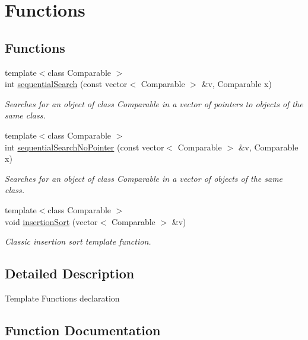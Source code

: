 \hypertarget{group___template}{}\section{Functions}
\label{group___template}
\subsection*{Functions}
\begin{DoxyCompactItemize}
\item 
{\footnotesize template$<$class Comparable $>$ }\\int \hyperlink{group___template_gacd555ad1f1fc3b2011aab63641f98151}{sequential\+Search} (const vector$<$ Comparable $>$ \&v, Comparable x)
\begin{DoxyCompactList}\small\item\em Searches for an object of class Comparable in a vector of pointers to objects of the same class. \end{DoxyCompactList}\item 
{\footnotesize template$<$class Comparable $>$ }\\int \hyperlink{group___template_gada542f6ca0126d949ac4f038116a57dd}{sequential\+Search\+No\+Pointer} (const vector$<$ Comparable $>$ \&v, Comparable x)
\begin{DoxyCompactList}\small\item\em Searches for an object of class Comparable in a vector of objects of the same class. \end{DoxyCompactList}\item 
{\footnotesize template$<$class Comparable $>$ }\\void \hyperlink{group___template_ga2d750432a373f9dab8039bef160b71a0}{insertion\+Sort} (vector$<$ Comparable $>$ \&v)
\begin{DoxyCompactList}\small\item\em Classic insertion sort template function. \end{DoxyCompactList}\end{DoxyCompactItemize}


\subsection{Detailed Description}
Template Functions declaration 

\subsection{Function Documentation}
\mbox{\label{group___template_ga2d750432a373f9dab8039bef160b71a0}} 
